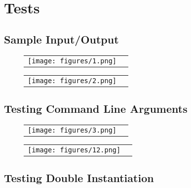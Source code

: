 \documentclass[twoside,11pt]{article}
\begin{document}
\section{Tests} 
\label{sec:background}

\subsection{Sample Input/Output}

\begin{figure}[h]
\begin{center}
\begin{tabular}{ll}
\texttt{[image: figures/1.png]}
\end{tabular}
\end{center}
\end{figure}

\begin{figure}[h]
\begin{center}
\begin{tabular}{ll}
\texttt{[image: figures/2.png]}
\end{tabular}
\end{center}
\end{figure}

\newpage

\subsection{Testing Command Line Arguments}

\begin{figure}[h]
\begin{center}
\begin{tabular}{ll}
\texttt{[image: figures/3.png]}
\end{tabular}
\end{center}
\end{figure}

\begin{figure}[h]
\begin{center}
\begin{tabular}{ll}
\texttt{[image: figures/12.png]}
\end{tabular}
\end{center}
\end{figure}

\subsection{Testing Double Instantiation}
\end{document}
